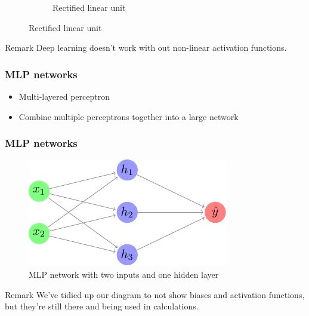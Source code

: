 \documentclass{beamer}
\begin{document}
\begin{frame}
\begin{figure}
\begin{subfigure}{0.45\textwidth}
{
            }
            \caption{Rectified linear unit}
        \end{subfigure}
    \end{figure}
    \begin{block}{Remark}
        Deep learning doesn't work with out non-linear activation functions.
    \end{block}
\end{frame}

\begin{frame}
    \frametitle{MLP networks}
    \begin{itemize}
        \item Multi-layered perceptron
        \item Combine multiple perceptrons together into a large network
    \end{itemize}
\end{frame}

\begin{frame}
    \frametitle{MLP networks}
    \begin{figure}
        \includegraphics{figures/basic-mlp/main.pdf}
        \caption{MLP network with two inputs and one hidden layer}
    \end{figure}
    \begin{block}{Remark}
        We've tidied up our diagram to not show biases and activation functions, but they're still there and being used in calculations.
    \end{block}
\end{frame}
\end{document}

